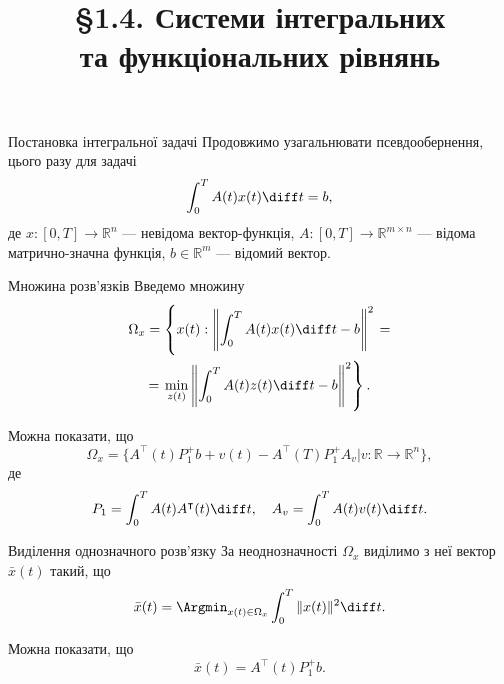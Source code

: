 \title[Системи інт{.} та функ{.} рівнянь]
{\S1.4. Системи інтегральних \\ та функціональних рівнянь}

\begin{frame}
    \titlepage
\end{frame}

\begin{mframe}{Постановка інтегральної задачі}
    Продовжимо узагальнювати псевдообернення, цього разу для задачі
    \begin{equation}
        \label{eq:1.35}
        \int_0^T A(t) x(t) \diff t = b,
    \end{equation}
    де $x: [0, T] \to \mathbb{R}^n$ --- невідома вектор-функція,
    $A: [0, T] \to \mathbb{R}^{m \times n}$ --- відома матрично-значна функція,
    $b \in \mathbb{R}^m$ --- відомий вектор.
\end{mframe}

\begin{mframe}{Множина розв'язків}
    Введемо множину
    \begin{multline}
        \label{eq:1.39}
        \Omega_x = \left\{ x(t): 
        \left\| \int_0^T A(t) x(t) \diff t - b \right\|^2 \right. = \\ 
        = \left. \min_{z(t)} 
        \left\| \int_0^T A(t) z(t) \diff t - b \right\|^2 \right\}.
    \end{multline}
    
    Можна показати, що 
    \begin{equation}
        \label{eq:1.43}
        \Omega_x =
        \Big\{ A^\intercal(t) P_1^+ b + v(t) - A^\intercal(T) P_1^+ A_v \Big| 
        v: \mathbb{R} \to \mathbb{R}^n \Big\},
    \end{equation}
    де
    \begin{equation*}
        P_1 = \int_0^T A(t) A^\intercal(t) \diff t, \quad A_v = 
        \int_0^T A(t) v(t) \diff t.
    \end{equation*}
\end{mframe}

\begin{mframe}{Виділення однозначного розв'язку}
    За неоднозначності $\Omega_x$ виділимо з неї вектор $\bar x(t)$ такий, що
    \begin{equation}
        \label{eq:1.41}
        \bar x(t) = \Argmin_{x(t) \in \Omega_x} \int_0^T \|x(t)\|^2 \diff t.
    \end{equation}
    
    Можна показати, що
    \begin{equation}
        \label{eq:1.45}
        \bar x(t) = A^\intercal(t) P_1^+ b.
    \end{equation}
\end{mframe}

